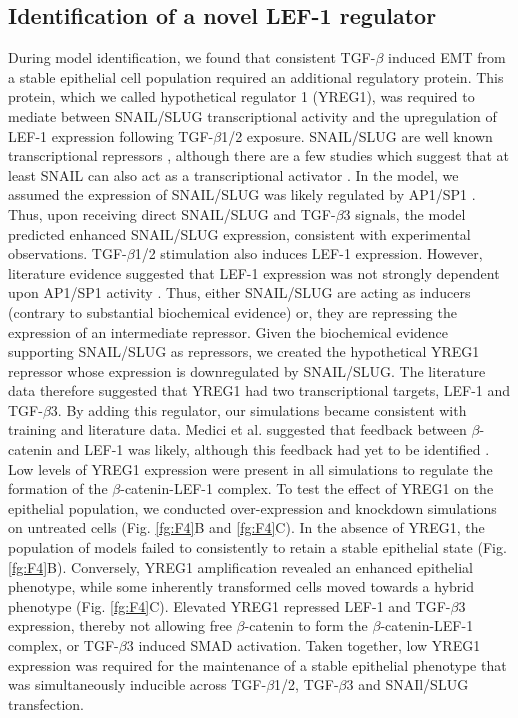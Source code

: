\documentclass[11pt,letterpaper]{article}
\begin{document}
\subsection*{Identification of a novel LEF-1 regulator}
During model identification, we found that consistent TGF-$\beta$ induced EMT from a stable epithelial cell population required an additional regulatory protein.
This protein, which we called hypothetical regulator 1 (YREG1), was required to mediate between SNAIL/SLUG transcriptional activity
and the upregulation of LEF-1 expression following TGF-$\beta$1/2 exposure.
SNAIL/SLUG are well known transcriptional repressors \cite{Hemavathy:2000aa,Hemavathy:2000ab,Dhasarathy:2011aa}, although there are a few studies
which suggest that at least SNAIL can also act as a transcriptional activator \cite{Guaita:2002aa}.
In the model, we assumed the expression of SNAIL/SLUG was likely regulated by AP1/SP1 \cite{Jackstadt:2013aa}.
Thus, upon receiving direct SNAIL/SLUG and TGF-$\beta$3 signals, the model predicted enhanced SNAIL/SLUG expression, consistent with experimental observations.
TGF-$\beta$1/2 stimulation also induces LEF-1 expression. However, literature evidence suggested that LEF-1 expression was not strongly dependent upon AP1/SP1 activity \cite{Eastman:1999aa}.
Thus, either SNAIL/SLUG are acting as inducers (contrary to substantial biochemical evidence) or, they are repressing the expression of an intermediate repressor.
Given the biochemical evidence supporting SNAIL/SLUG as repressors, we created the hypothetical YREG1 repressor whose
expression is downregulated by SNAIL/SLUG. The literature data therefore suggested that YREG1 had two transcriptional targets, LEF-1 and TGF-$\beta$3.
By adding this regulator, our simulations became consistent with training and literature data.
Medici et al. suggested that feedback between $\beta$-catenin and LEF-1 was likely, although this feedback had yet to be identified \cite{Medici:2008fk}.
Low levels of YREG1 expression were present in all simulations to regulate the formation of the $\beta$-catenin-LEF-1 complex.
To test the effect of YREG1 on the epithelial population, we conducted over-expression and knockdown simulations on untreated cells (Fig. \ref{fg:F4}B and \ref{fg:F4}C).
In the absence of YREG1, the population of models failed to consistently to retain a stable epithelial state (Fig. \ref{fg:F4}B).
Conversely, YREG1 amplification revealed an enhanced epithelial phenotype, while some inherently transformed cells moved towards a hybrid phenotype  (Fig. \ref{fg:F4}C).
Elevated YREG1 repressed LEF-1 and TGF-$\beta$3 expression, thereby not allowing free $\beta$-catenin to form the $\beta$-catenin-LEF-1 complex, or TGF-$\beta$3 induced SMAD activation.
Taken together, low YREG1 expression was required for the maintenance of a stable epithelial phenotype that was simultaneously inducible across TGF-$\beta$1/2, TGF-$\beta$3 and SNAIl/SLUG transfection.
\end{document}
